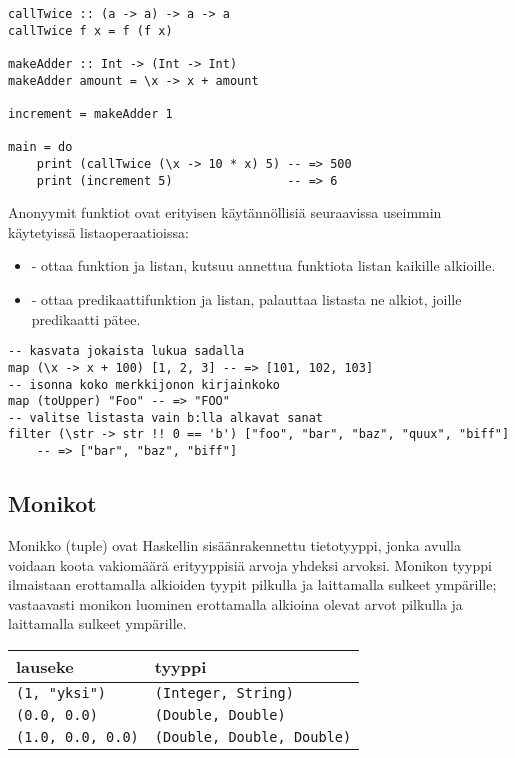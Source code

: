 \begin{verbatim}
callTwice :: (a -> a) -> a -> a
callTwice f x = f (f x)

makeAdder :: Int -> (Int -> Int)
makeAdder amount = \x -> x + amount

increment = makeAdder 1

main = do
    print (callTwice (\x -> 10 * x) 5) -- => 500
    print (increment 5)                -- => 6
\end{verbatim}
Anonyymit funktiot ovat erityisen käytännöllisiä seuraavissa useimmin käytetyissä listaoperaatioissa:
\begin{itemize}
    \item {} - ottaa funktion ja listan, kutsuu annettua funktiota listan kaikille alkioille.
    \item {} - ottaa predikaattifunktion ja listan, palauttaa listasta ne alkiot, joille predikaatti pätee.
\end{itemize}
\begin{verbatim}
-- kasvata jokaista lukua sadalla
map (\x -> x + 100) [1, 2, 3] -- => [101, 102, 103]
-- isonna koko merkkijonon kirjainkoko
map (toUpper) "Foo" -- => "FOO"
-- valitse listasta vain b:lla alkavat sanat
filter (\str -> str !! 0 == 'b') ["foo", "bar", "baz", "quux", "biff"]
    -- => ["bar", "baz", "biff"]
\end{verbatim}

\subsection{Monikot}
Monikko (tuple) ovat Haskellin sisäänrakennettu tietotyyppi,
jonka avulla voidaan koota vakiomäärä erityyppisiä arvoja yhdeksi arvoksi.
Monikon tyyppi ilmaistaan erottamalla alkioiden tyypit pilkulla ja laittamalla sulkeet ympärille;
vastaavasti monikon luominen erottamalla alkioina olevat arvot pilkulla ja laittamalla sulkeet ympärille.
\begin{center}
    \begin{tabular}[H]{l|l}
        lauseke                  &   tyyppi         \\
        \hline
        \texttt{(1, "yksi")}     &   \texttt{(Integer, String)}        \\
        \texttt{(0.0, 0.0)}      &   \texttt{(Double, Double)} \\
        \texttt{(1.0, 0.0, 0.0)} &   \texttt{(Double, Double, Double)} \\
    \end{tabular}
\end{center}

